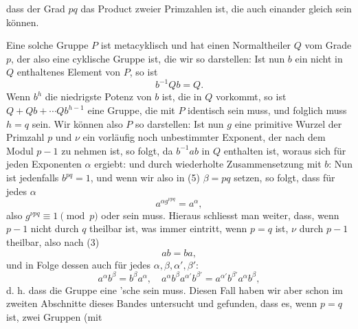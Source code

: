 dass der Grad $pq$ das Product zweier Primzahlen ist, die auch einander gleich sein können.

Eine solche Gruppe $P$ ist metacyklisch und hat einen Normaltheiler $Q$ vom Grade $p$, der also eine cyklische Gruppe ist, die wir so darstellen:
Ist nun $b$ ein nicht in $Q$ enthaltenes Element von $P$, so ist
\[
b^{-1} Q b = Q.
\]
Wenn $b^h$ die niedrigste Potenz von $b$ ist, die in $Q$ vorkommt, so ist $Q + Qb + \cdots Qb^{h-1}$ eine Gruppe, die mit $P$ identisch sein muss, und folglich muss $h = q$ sein. Wir können also $P$ so darstellen:
Ist nun $g$ eine primitive Wurzel der Primzahl $p$ und $\nu$ ein vorläufig noch unbestimmter Exponent, der nach dem Modul $p - 1$ zu nehmen ist, so folgt, da $b^{-1} a b$ in $Q$ enthalten ist,
woraus sich für jeden Exponenten $\alpha$ ergiebt:
und durch wiederholte Zusammensetzung mit $b$:
Nun ist jedenfalls $b^{pq} = 1$, und wenn wir also in (5) $\beta = pq$ setzen, so folgt, dass für jedes $\alpha$
\[
a^{\alpha g^{\nu pq}} = a^\alpha,
\]
also $g^{\nu pq} \equiv 1 \pmod{p}$ oder
sein muss. Hieraus schliesst man weiter, dass, wenn $p - 1$ nicht durch $q$ theilbar ist, was immer eintritt, wenn $p = q$ ist, $\nu$ durch $p - 1$ theilbar, also nach (3)
\[
ab = ba,
\]
und in Folge dessen auch für jedes $\alpha, \beta, \alpha', \beta'$:
\[
a^\alpha b^\beta = b^\beta a^\alpha, \quad a^\alpha b^\beta a^{\alpha'} b^{\beta'} = a^{\alpha'} b^{\beta'} a^\alpha b^\beta,
\]
d. h. dass die Gruppe eine 'sche sein muss. Diesen Fall haben wir aber schon im zweiten Abschnitte dieses Bandes untersucht und gefunden, dass es, wenn $p = q$ ist, zwei Gruppen (mit
